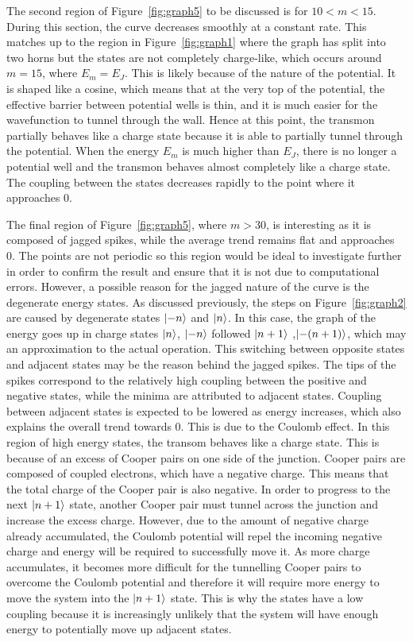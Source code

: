 \documentclass[11pt]{article}
\begin{document}
The second region of Figure~\ref{fig:graph5} to be discussed is for $10<m<15$. During this section, the curve decreases smoothly at a constant rate. This matches up to the region in Figure~\ref{fig:graph1} where the graph has split into two horns but the states are not completely charge-like, which occurs around $m=15$, where $E_m = E_J$. This is likely because of the nature of the potential. It is shaped like a cosine, which means that at the very top of the potential, the effective barrier between potential wells is thin, and it is much easier for the wavefunction to tunnel through the wall. Hence at this point, the transmon partially behaves like a charge state because it is able to partially tunnel through the potential. When the energy $E_m$ is much higher than $E_J$, there is no longer a potential well and the transmon behaves almost completely like a charge state. The coupling between the states decreases rapidly to the point where it approaches 0.

The final region of Figure~\ref{fig:graph5}, where $m>30$, is interesting as it is composed of jagged spikes, while the average trend remains flat and approaches 0. The points are not periodic so this region would be ideal to investigate further in order to confirm the result and ensure that it is not due to computational errors. However, a possible reason for the jagged nature of the curve is the degenerate energy states. As discussed previously, the steps on Figure~\ref{fig:graph2} are caused by degenerate states $\ket{-n}$ and $\ket{n}$. In this case, the graph of the energy goes up in charge states $\ket{n}$, $\ket{-n}$ followed $\ket{n+1}$ ,$\ket{-(n+1)}$, which may an approximation to the actual operation. This switching between opposite states and adjacent states may be the reason behind the jagged spikes. The tips of the spikes correspond to the relatively high coupling between the positive and negative states, while the minima are attributed to adjacent states. Coupling between adjacent states is expected to be lowered as energy increases, which also explains the overall trend towards 0. This is due to the Coulomb effect. In this region of high energy states, the transom behaves like a charge state. This is because of an excess of Cooper pairs on one side of the junction. Cooper pairs are composed of coupled electrons, which have a negative charge. This means that the total charge of the Cooper pair is also negative. In order to progress to the next $\ket{n+1}$ state, another Cooper pair must tunnel across the junction and increase the excess charge. However, due to the amount of negative charge already accumulated, the Coulomb potential will repel the incoming negative charge and energy will be required to successfully move it. As more charge accumulates, it becomes more difficult for the tunnelling Cooper pairs to overcome the Coulomb potential and therefore it will require more energy to move the system into the $\ket{n+1}$ state. This is why the states have a low coupling because it is increasingly unlikely that the system will have enough energy to potentially move up adjacent states.
\end{document}
